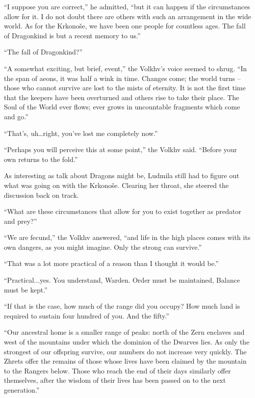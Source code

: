  

“I suppose you are correct,” he admitted, “but it can happen if the circumstances allow for it. I do not doubt there are others with such an arrangement in the wide world. As for the Krkonoše, we have been one people for countless ages. The fall of Dragonkind is but a recent memory to us.”

 

“The fall of Dragonkind?”

 

“A somewhat exciting, but brief, event,” the Volkhv’s voice seemed to shrug. “In the span of aeons, it was half a wink in time. Changes come; the world turns – those who cannot survive are lost to the mists of eternity. It is not the first time that the keepers have been overturned and others rise to take their place. The Soul of the World ever flows; ever grows in uncountable fragments which come and go.”

 

“That’s, uh…right, you’ve lost me completely now.”

 

“Perhaps you will perceive this at some point,” the Volkhv said. “Before your own returns to the fold.”

 

As interesting as talk about Dragons might be, Ludmila still had to figure out what was going on with the Krkonoše. Clearing her throat, she steered the discussion back on track.

 

“What are these circumstances that allow for you to exist together as predator and prey?”

 

“We are fecund,” the Volkhv answered, “and life in the high places comes with its own dangers, as you might imagine. Only the strong can survive.”

 

“That was a lot more practical of a reason than I thought it would be.”

 

“Practical...yes. You understand, Warden. Order must be maintained, Balance must be kept.”

 

“If that is the case, how much of the range did you occupy? How much land is required to sustain four hundred of you. And the fifty.”

 

“Our ancestral home is a smaller range of peaks: north of the Zern enclaves and west of the mountains under which the dominion of the Dwarves lies. As only the strongest of our offspring survive, our numbers do not increase very quickly. The Zhrets offer the remains of those whose lives have been claimed by the mountain to the Rangers below. Those who reach the end of their days similarly offer themselves, after the wisdom of their lives has been passed on to the next generation.”


